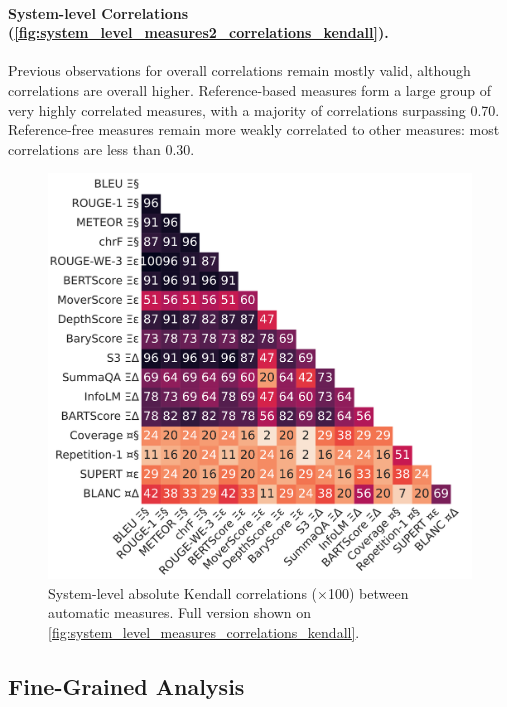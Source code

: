 \paragraph{System-level Correlations (\autoref{fig:system_level_measures2_correlations_kendall}).}
Previous observations for overall correlations remain mostly valid, although correlations are overall higher. Reference-based measures form a large group of very highly correlated measures, with a majority of correlations surpassing 0.70.
Reference-free measures remain more weakly correlated to other measures: most correlations are less than 0.30.

\begin{figure}[!h]
\centering
\includegraphics[width=\columnwidth]{pictures/metrics_filtered_system_kendall.pdf}
\caption{System-level absolute Kendall correlations ($\times$100) between automatic measures. Full version shown on \autoref{fig:system_level_measures_correlations_kendall}.}
\label{fig:system_level_measures2_correlations_kendall}
\end{figure}

\clearpage

\subsection{Fine-Grained Analysis}
\label{sub:fine_grained_analysis}

